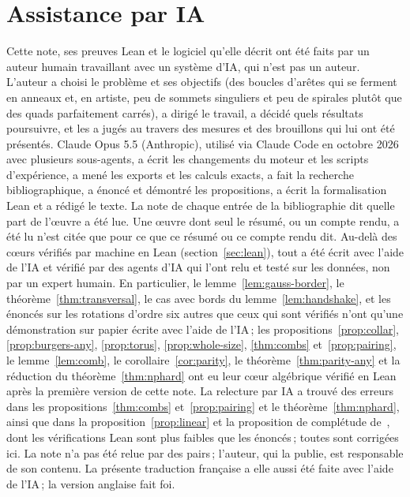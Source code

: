 \documentclass[11pt,a4paper]{article}
\begin{document}
\section*{Assistance par IA}
Cette note, ses preuves Lean et le logiciel qu'elle décrit ont été faits par
un auteur humain travaillant avec un système d'IA, qui n'est pas un auteur.
L'auteur a choisi le problème et ses objectifs (des boucles d'arêtes qui se
ferment en anneaux et, en artiste, peu de sommets singuliers et peu de
spirales plutôt que des quads parfaitement carrés), a dirigé le travail, a
décidé quels résultats poursuivre, et les a jugés au travers des mesures et
des brouillons qui lui ont été présentés. Claude Opus 5.5 (Anthropic), utilisé
via Claude Code en octobre 2026 avec plusieurs sous-agents, a écrit les
changements du moteur et les scripts d'expérience, a mené les exports et les
calculs exacts, a fait la recherche bibliographique, a énoncé et démontré les
propositions, a écrit la formalisation Lean et a rédigé le texte. La note de
chaque entrée de la bibliographie dit quelle part de l'œuvre a été lue. Une œuvre dont seul le résumé, ou un compte rendu, a été lu n'est citée que pour ce que ce résumé ou ce compte rendu dit.
Au-delà des cœurs vérifiés par machine en Lean (section~\ref{sec:lean}), tout
a été écrit avec l'aide de l'IA et vérifié par des agents d'IA qui l'ont relu
et testé sur les données, non par un expert humain. En particulier, le
lemme~\ref{lem:gauss-border}, le théorème~\ref{thm:transversal}, le cas avec
bords du lemme~\ref{lem:handshake}, et les énoncés sur les rotations d'ordre
six autres que ceux qui sont vérifiés n'ont qu'une démonstration sur papier
écrite avec l'aide de l'IA\,; les propositions~\ref{prop:collar},
\ref{prop:burgers-any}, \ref{prop:torus}, \ref{prop:whole-size},
\ref{thm:combs} et~\ref{prop:pairing}, le
lemme~\ref{lem:comb}, le corollaire~\ref{cor:parity}, le
théorème~\ref{thm:parity-any} et la réduction du théorème~\ref{thm:nphard}
ont eu leur cœur algébrique vérifié en Lean après la première version de
cette note. La relecture par IA a trouvé des erreurs
dans les propositions~\ref{thm:combs} et~\ref{prop:pairing} et le
théorème~\ref{thm:nphard}, ainsi que dans la proposition~\ref{prop:linear} et
la proposition de complétude de~\cite{gardent2026loops}, dont les
vérifications Lean sont plus faibles que les énoncés\,; toutes sont corrigées
ici. La note n'a pas été relue par des pairs\,; l'auteur, qui la publie, est
responsable de son contenu. La présente traduction française a elle aussi été
faite avec l'aide de l'IA\,; la version anglaise fait foi.
\end{document}
